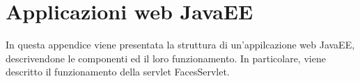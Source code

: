 \chapter{Applicazioni web JavaEE}\label{app:javaee}
\begin{flushright}
	\parbox{13cm}{\small In questa appendice viene presentata la struttura di un'appilcazione web JavaEE, descrivendone le componenti ed il loro funzionamento. In particolare, viene descritto il funzionamento della servlet FacesServlet.}
\end{flushright}